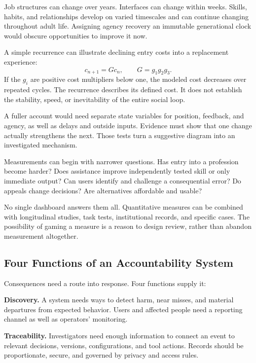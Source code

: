 \documentclass[11pt,openany]{book}
\begin{document}
Job structures can change over years. Interfaces can change within weeks. Skills, habits, and relationships develop on varied timescales and can continue changing throughout adult life. Assigning agency recovery an immutable generational clock would obscure opportunities to improve it now.

A simple recurrence can illustrate declining entry costs into a replacement experience:
\begin{equation}
 c_{n+1}=Gc_n,\qquad
 G=g_1g_2g_3.
\end{equation}
If the $g_i$ are positive cost multipliers below one, the modeled cost decreases over repeated cycles. The recurrence describes its defined cost. It does not establish the stability, speed, or inevitability of the entire social loop.

A fuller account would need separate state variables for position, feedback, and agency, as well as delays and outside inputs. Evidence must show that one change actually strengthens the next. Those tests turn a suggestive diagram into an investigated mechanism.

Measurements can begin with narrower questions. Has entry into a profession become harder? Does assistance improve independently tested skill or only immediate output? Can users identify and challenge a consequential error? Do appeals change decisions? Are alternatives affordable and usable?

No single dashboard answers them all. Quantitative measures can be combined with longitudinal studies, task tests, institutional records, and specific cases. The possibility of gaming a measure is a reason to design review, rather than abandon measurement altogether.

\subsection{Four Functions of an Accountability System}

Consequences need a route into response. Four functions supply it:

\textbf{Discovery.} A system needs ways to detect harm, near misses, and material departures from expected behavior. Users and affected people need a reporting channel as well as operators' monitoring.

\textbf{Traceability.} Investigators need enough information to connect an event to relevant decisions, versions, configurations, and tool actions. Records should be proportionate, secure, and governed by privacy and access rules.
\end{document}
